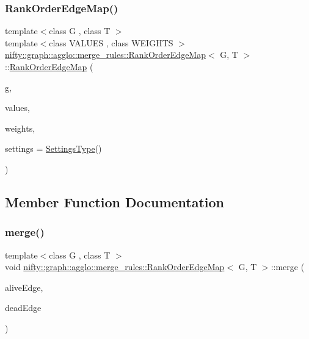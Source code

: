 \subsubsection{\texorpdfstring{Rank\+Order\+Edge\+Map()}{RankOrderEdgeMap()}}
{\footnotesize\ttfamily template$<$class G , class T $>$ \\
template$<$class V\+A\+L\+U\+ES , class W\+E\+I\+G\+H\+TS $>$ \\
\hyperlink{classnifty_1_1graph_1_1agglo_1_1merge__rules_1_1RankOrderEdgeMap}{nifty\+::graph\+::agglo\+::merge\+\_\+rules\+::\+Rank\+Order\+Edge\+Map}$<$ G, T $>$\+::\hyperlink{classnifty_1_1graph_1_1agglo_1_1merge__rules_1_1RankOrderEdgeMap}{Rank\+Order\+Edge\+Map} (\begin{DoxyParamCaption}\item[{const \hyperlink{classnifty_1_1graph_1_1agglo_1_1merge__rules_1_1RankOrderEdgeMap_af6ef0c41c3cbeb666e040e06ebcda4c6}{Graph\+Type} \&}]{g,  }\item[{const V\+A\+L\+U\+ES \&}]{values,  }\item[{const W\+E\+I\+G\+H\+TS \&}]{weights,  }\item[{const \hyperlink{classnifty_1_1graph_1_1agglo_1_1merge__rules_1_1RankOrderEdgeMap_a6b6c608fd32fef4275091eba71bb6e1a}{Settings\+Type} \&}]{settings = {\ttfamily \hyperlink{classnifty_1_1graph_1_1agglo_1_1merge__rules_1_1RankOrderEdgeMap_a6b6c608fd32fef4275091eba71bb6e1a}{Settings\+Type}()} }\end{DoxyParamCaption})\hspace{0.3cm}{\ttfamily [inline]}}



\subsection{Member Function Documentation}
\mbox{\label{classnifty_1_1graph_1_1agglo_1_1merge__rules_1_1RankOrderEdgeMap_a6c3273f47e4788c38bb9e884e3ad968a}} 
\subsubsection{\texorpdfstring{merge()}{merge()}}
{\footnotesize\ttfamily template$<$class G , class T $>$ \\
void \hyperlink{classnifty_1_1graph_1_1agglo_1_1merge__rules_1_1RankOrderEdgeMap}{nifty\+::graph\+::agglo\+::merge\+\_\+rules\+::\+Rank\+Order\+Edge\+Map}$<$ G, T $>$\+::merge (\begin{DoxyParamCaption}\item[{const uint64\+\_\+t}]{alive\+Edge,  }\item[{const uint64\+\_\+t}]{dead\+Edge }\end{DoxyParamCaption})\hspace{0.3cm}{\ttfamily [inline]}}

